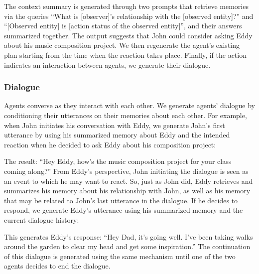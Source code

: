 \begin{quote}

\end{quote}

The context summary is generated through two prompts that retrieve memories via the queries ``What is [observer]’s relationship with the [observed entity]?'' and ``[Observed entity] is [action status of the observed entity]'', and their answers summarized together. The output suggests that {\color{darkgray}\small\fontfamily{}\selectfont
John could consider asking Eddy about his music composition project}. We then regenerate the agent's existing plan starting from the time when the reaction takes place. Finally, if the action indicates an interaction between agents, we generate their dialogue.

\subsubsection{Dialogue}
Agents converse as they interact with each other. We generate agents' dialogue by conditioning their utterances on their memories about each other. For example, when John initiates his conversation with Eddy, we generate John's first utterance by using his summarized memory about Eddy and the intended reaction when he decided to ask Eddy about his composition project:

\begin{quote}

\end{quote}

The result: {\color{darkgray}\small\fontfamily{}\selectfont
``Hey Eddy, how's the music composition project for your class coming along?''} From Eddy's perspective, John initiating the dialogue is seen as an event to which he may want to react. So, just as John did, Eddy retrieves and summarizes his memory about his relationship with John, as well as his memory that may be related to John's last utterance in the dialogue. If he decides to respond, we generate Eddy's utterance using his summarized memory and the current dialogue history:

\begin{quote}

\end{quote}

This generates Eddy's response: {\color{darkgray}\small\fontfamily{}\selectfont
``Hey Dad, it's going well. I've been taking walks around the garden to clear my head and get some inspiration.''} The continuation of this dialogue is generated using the same mechanism until one of the two agents decides to end the dialogue.

